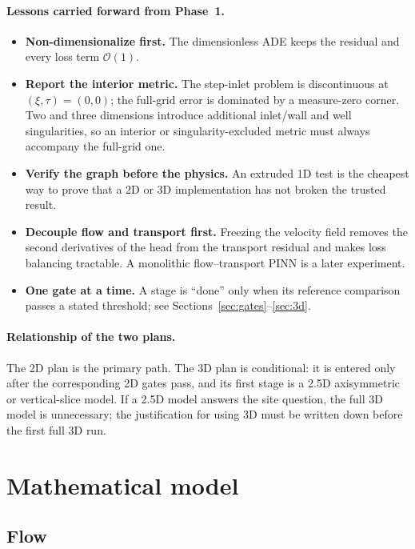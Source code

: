 \documentclass[11pt]{article}
\begin{document}
\paragraph{Lessons carried forward from Phase~1.}
\begin{itemize}[leftmargin=1.6em,itemsep=2pt]
  \item \textbf{Non-dimensionalize first.}  The dimensionless ADE keeps the
        residual and every loss term $\mathcal{O}(1)$.
  \item \textbf{Report the interior metric.}  The step-inlet problem is
        discontinuous at $(\xi,\tau)=(0,0)$; the full-grid error is dominated
        by a measure-zero corner.  Two and three dimensions introduce
        additional inlet/wall and well singularities, so an interior or
        singularity-excluded metric must always accompany the full-grid one.
  \item \textbf{Verify the graph before the physics.}  An extruded 1D test is
        the cheapest way to prove that a 2D or 3D implementation has not
        broken the trusted result.
  \item \textbf{Decouple flow and transport first.}  Freezing the velocity
        field removes the second derivatives of the head from the transport
        residual and makes loss balancing tractable.  A monolithic
        flow--transport PINN is a later experiment.
  \item \textbf{One gate at a time.}  A stage is ``done'' only when its
        reference comparison passes a stated threshold; see
        Sections~\ref{sec:gates}--\ref{sec:3d}.
\end{itemize}

\paragraph{Relationship of the two plans.}
The 2D plan is the primary path.  The 3D plan is conditional: it is entered
only after the corresponding 2D gates pass, and its first stage is a 2.5D
axisymmetric or vertical-slice model.  If a 2.5D model answers the site
question, the full 3D model is unnecessary; the justification for using 3D
must be written down before the first full 3D run.

\section{Mathematical model}
\label{sec:model}

\subsection{Flow}
\end{document}
